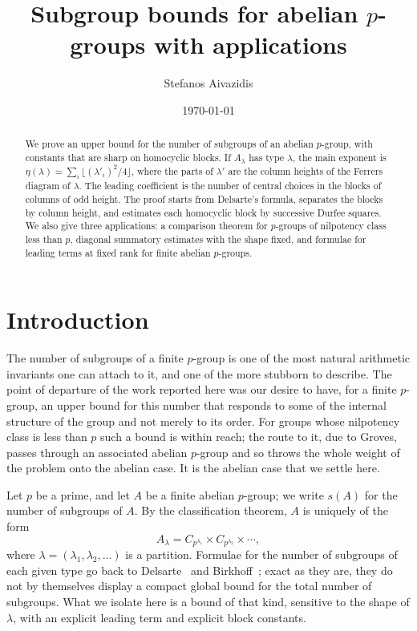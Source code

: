 \documentclass[a4paper,11pt,reqno]{amsart}
\theoremstyle{plain}
\theoremstyle{remark}
\numberwithin{equation}{section}
\begin{document}
\title{Subgroup bounds for abelian $p$-groups with applications}
\author{Stefanos Aivazidis}
\date{\today}

\begin{abstract}
We prove an upper bound for the number of subgroups of an abelian $p$-group,
with constants that are sharp on homocyclic blocks. If $A_\lambda$ has type
$\lambda$, the main exponent is
$\eta(\lambda)=\sum_i\lfloor(\lambda'_i)^2/4\rfloor$, where the parts of
$\lambda'$ are the column heights of the Ferrers diagram of $\lambda$. 
The leading coefficient is the number of central choices in the blocks of
columns of odd height. 
The proof starts from Delsarte's formula, separates the blocks by column
height, and estimates each homocyclic block by successive Durfee squares.
We also give three applications: a comparison theorem for $p$-groups of
nilpotency class less than $p$, diagonal summatory estimates with the shape
fixed, and formulae for leading terms at fixed rank for finite abelian
$p$-groups.
\end{abstract}

\maketitle

\section{Introduction}
\label{sec:overview}

The number of subgroups of a finite $p$-group is one of the most natural
arithmetic invariants one can attach to it, and one of the more stubborn to
describe. The point of departure of the work reported here was our desire
to have, for a finite $p$-group, an upper bound for this number that responds
to some of the internal structure of the group and not merely to its order. For groups whose
nilpotency class is less than $p$ such a bound is within reach; the route
to it, due to Groves, passes through an associated abelian $p$-group and so
throws the whole weight of the problem onto the abelian case. It is the
abelian case that we settle here.

Let $p$ be a prime, and let $A$ be a finite abelian $p$-group; we write
$s(A)$ for the number of subgroups of $A$. By the classification theorem,
$A$ is uniquely of the form
\[
        A_\lambda=
        C_{p^{\lambda_1}}\times C_{p^{\lambda_2}}\times\cdots,
\]
where $\lambda=(\lambda_1,\lambda_2,\ldots)$ is a partition. Formulae for
the number of subgroups of each given type go back to
Delsarte~\cite{Delsarte} and Birkhoff~\cite{Birkhoff}; exact as they are,
they do not by themselves display a compact global bound for the total
number of subgroups. What we isolate here is a bound of that kind, sensitive
to the shape of $\lambda$, with an explicit leading term and explicit block
constants.
\end{document}
